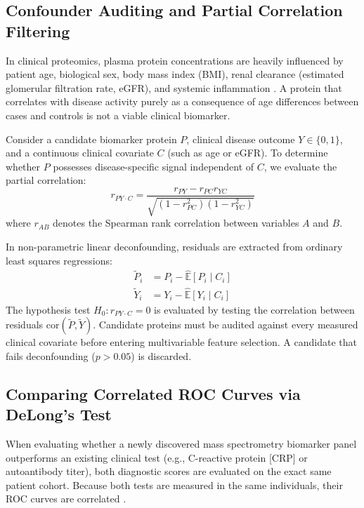 \documentclass[11pt,twoside,openright]{book}
\begin{document}
\subsection{Confounder Auditing and Partial Correlation Filtering}

In clinical proteomics, plasma protein concentrations are heavily influenced by patient age, biological sex, body mass index (BMI), renal clearance (estimated glomerular filtration rate, eGFR), and systemic inflammation \cite{birkner2026metadeconfoundr}. A protein that correlates with disease activity purely as a consequence of age differences between cases and controls is not a viable clinical biomarker.

Consider a candidate biomarker protein $P$, clinical disease outcome $Y \in \{0, 1\}$, and a continuous clinical covariate $C$ (such as age or eGFR). To determine whether $P$ possesses disease-specific signal independent of $C$, we evaluate the partial correlation:
\begin{equation}
r_{PY \cdot C} = \frac{r_{PY} - r_{PC} r_{YC}}{\sqrt{(1 - r_{PC}^2)(1 - r_{YC}^2)}}
\label{eq:partial_cor}
\end{equation}
where $r_{AB}$ denotes the Spearman rank correlation between variables $A$ and $B$.

In non-parametric linear deconfounding, residuals are extracted from ordinary least squares regressions:
\begin{align}
\tilde{P}_i &= P_i - \hat{\mathbb{E}}[P_i \mid C_i] \\
\tilde{Y}_i &= Y_i - \hat{\mathbb{E}}[Y_i \mid C_i]
\end{align}
The hypothesis test $H_0: r_{PY \cdot C} = 0$ is evaluated by testing the correlation between residuals $\text{cor}(\tilde{P}, \tilde{Y})$. Candidate proteins must be audited against every measured clinical covariate before entering multivariable feature selection. A candidate that fails deconfounding ($p > 0.05$) is discarded.

\subsection{Comparing Correlated ROC Curves via DeLong's Test}

When evaluating whether a newly discovered mass spectrometry biomarker panel outperforms an existing clinical test (e.g., C-reactive protein [CRP] or autoantibody titer), both diagnostic scores are evaluated on the exact same patient cohort. Because both tests are measured in the same individuals, their ROC curves are correlated \cite{delong1988comparing}.
\end{document}
